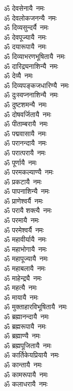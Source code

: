 \begin{flushleft}
\begin{multicols}{2}
ॐ देवसेनायै~नमः\\
ॐ देवलोकजनन्यै~नमः\\
ॐ दिव्यसुन्दर्यै~नमः\\
ॐ देवपूज्यायै~नमः\\
ॐ दयारूपायै~नमः\\
ॐ दिव्याभरणभूषितायै~नमः\\
ॐ दारिद्र्यनाशिन्यै~नमः\\
ॐ देव्यै~नमः\\
ॐ दिव्यपङ्कजधारिण्यै~नमः\\
ॐ दुःस्वप्ननाशिन्यै~नमः\hfill{}\\
ॐ दुष्टशमन्यै~नमः\\
ॐ दोषवर्जितायै~नमः\\
ॐ पीताम्बरायै~नमः\\
ॐ पद्मवासायै~नमः\\
ॐ परानन्दायै~नमः\\
ॐ परात्परायै~नमः\\
ॐ पूर्णायै~नमः\\
ॐ परमकल्याण्यै~नमः\\
ॐ प्रकटायै~नमः\\
ॐ पापनाशिन्यै~नमः\hfill{}\\
ॐ प्राणेश्वर्यै~नमः\\
ॐ परायै शक्त्यै~नमः\\
ॐ परमायै~नमः\\
ॐ परमेश्वर्यै~नमः\\
ॐ महावीर्यायै~नमः\\
ॐ महाभोगायै~नमः\\
ॐ महापूज्यायै~नमः\\
ॐ महाबलायै~नमः\\
ॐ माहेन्द्र्यै~नमः\\
ॐ महत्यै~नमः\hfill{}\\
ॐ मायायै~नमः\\
ॐ मुक्ताहारविभूषितायै~नमः\\
ॐ ब्रह्मानन्दायै~नमः\\
ॐ ब्रह्मरूपायै~नमः\\
ॐ ब्रह्माण्यै~नमः\\
ॐ ब्रह्मपूजितायै~नमः\\
ॐ कार्तिकेयप्रियायै~नमः\\
ॐ कान्तायै~नमः\\
ॐ कामरूपायै~नमः\\
ॐ कलाधरायै~नमः\hfill{}\\

\end{multicols}
\end{flushleft}
